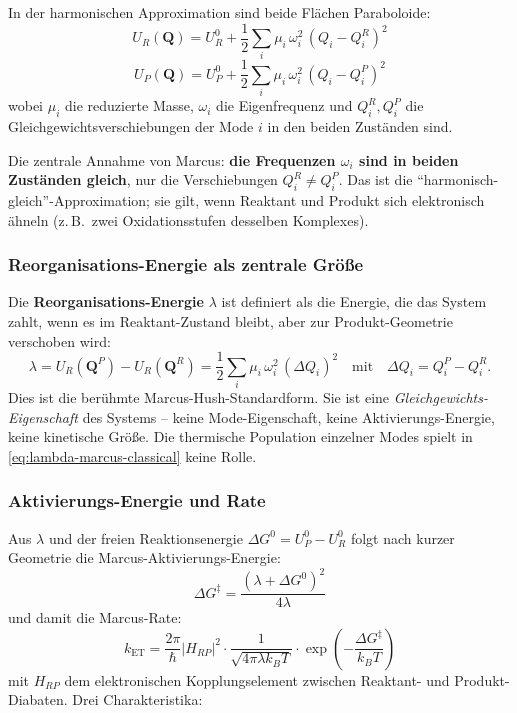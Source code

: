 \documentclass[11pt,a4paper,twoside]{article}
\theoremstyle{remark}
\begin{document}
In der harmonischen Approximation sind beide Fl\"achen Paraboloide:
\begin{equation}
  U_R(\mathbf{Q}) = U_R^0 + \frac{1}{2}\sum_i \mu_i\,\omega_i^2\,
                       (Q_i - Q_i^R)^2
\end{equation}
\begin{equation}
  U_P(\mathbf{Q}) = U_P^0 + \frac{1}{2}\sum_i \mu_i\,\omega_i^2\,
                       (Q_i - Q_i^P)^2
\end{equation}
wobei $\mu_i$ die reduzierte Masse, $\omega_i$ die Eigenfrequenz und
$Q_i^R, Q_i^P$ die Gleichgewichtsverschiebungen der Mode $i$ in den
beiden Zust\"anden sind.

Die zentrale Annahme von Marcus: \textbf{die Frequenzen $\omega_i$
sind in beiden Zust\"anden gleich}, nur die Verschiebungen
$Q_i^R \neq Q_i^P$. Das ist die "`harmonisch-gleich"'-Approximation;
sie gilt, wenn Reaktant und Produkt sich elektronisch \"ahneln (z.\,B.\
zwei Oxidationsstufen desselben Komplexes).

\subsubsection*{Reorganisations-Energie als zentrale Gr\"o{\ss}e}

Die \textbf{Reorganisations-Energie} $\lambda$ ist definiert als die
Energie, die das System zahlt, wenn es im Reaktant-Zustand bleibt,
aber zur Produkt-Geometrie verschoben wird:
\begin{equation}
  \lambda = U_R(\mathbf{Q}^P) - U_R(\mathbf{Q}^R)
          = \frac{1}{2}\sum_i \mu_i\,\omega_i^2\,(\Delta Q_i)^2
  \quad\text{mit}\quad \Delta Q_i = Q_i^P - Q_i^R.
  \label{eq:lambda-marcus-classical}
\end{equation}
Dies ist die ber\"uhmte Marcus-Hush-Standardform. Sie ist eine
\emph{Gleichgewichts-Eigenschaft} des Systems -- keine
Mode-Eigenschaft, keine Aktivierungs-Energie, keine kinetische
Gr\"o{\ss}e. Die thermische Population einzelner Modes spielt in
\eqref{eq:lambda-marcus-classical} keine Rolle.

\subsubsection*{Aktivierungs-Energie und Rate}

Aus $\lambda$ und der freien Reaktionsenergie $\Delta G^0 = U_P^0 -
U_R^0$ folgt nach kurzer Geometrie die Marcus-Aktivierungs-Energie:
\begin{equation}
  \Delta G^\ddagger = \frac{(\lambda + \Delta G^0)^2}{4\lambda}
\end{equation}
und damit die Marcus-Rate:
\begin{equation}
  k_\text{ET} = \frac{2\pi}{\hbar}|H_{RP}|^2 \cdot
                \frac{1}{\sqrt{4\pi\lambda k_BT}} \cdot
                \exp\!\left(-\frac{\Delta G^\ddagger}{k_BT}\right)
  \label{eq:marcus-rate}
\end{equation}
mit $H_{RP}$ dem elektronischen Kopplungselement zwischen Reaktant-
und Produkt-Diabaten. Drei Charakteristika:
\end{document}
